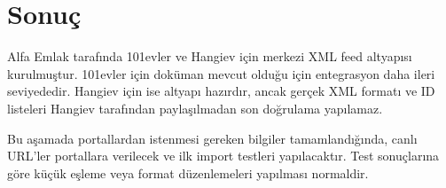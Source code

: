 \documentclass[11pt,a4paper]{article}
\begin{document}
\section{Sonuç}

Alfa Emlak tarafında 101evler ve Hangiev için merkezi XML feed altyapısı kurulmuştur. 101evler için doküman mevcut olduğu için entegrasyon daha ileri seviyededir. Hangiev için ise altyapı hazırdır, ancak gerçek XML formatı ve ID listeleri Hangiev tarafından paylaşılmadan son doğrulama yapılamaz.

Bu aşamada portallardan istenmesi gereken bilgiler tamamlandığında, canlı URL'ler portallara verilecek ve ilk import testleri yapılacaktır. Test sonuçlarına göre küçük eşleme veya format düzenlemeleri yapılması normaldir.
\end{document}
